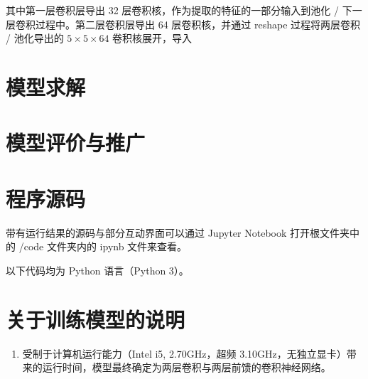 \documentclass[UTF8]{ctexart}
\begin{document}
其中第一层卷积层导出 32 层卷积核，作为提取的特征的一部分输入到池化 / 下一层卷积过程中。第二层卷积层导出 64 层卷积核，并通过 reshape 过程将两层卷积 / 池化导出的 $5 \times 5 \times 64$ 卷积核展开，导入

\section{模型求解}


\section{模型评价与推广}

\clearpage
\appendix
\appendixname
\section{程序源码}
带有运行结果的源码与部分互动界面可以通过 Jupyter Notebook 打开根文件夹中的 /code 文件夹内的 ipynb 文件来查看。

以下代码均为 Python 语言（Python 3）。

\section{关于训练模型的说明}
\begin{enumerate}
\item 受制于计算机运行能力（Intel i5, 2.70GHz，超频 3.10GHz，无独立显卡）带来的运行时间，模型最终确定为两层卷积与两层前馈的卷积神经网络。
\end{enumerate}
\end{document}
